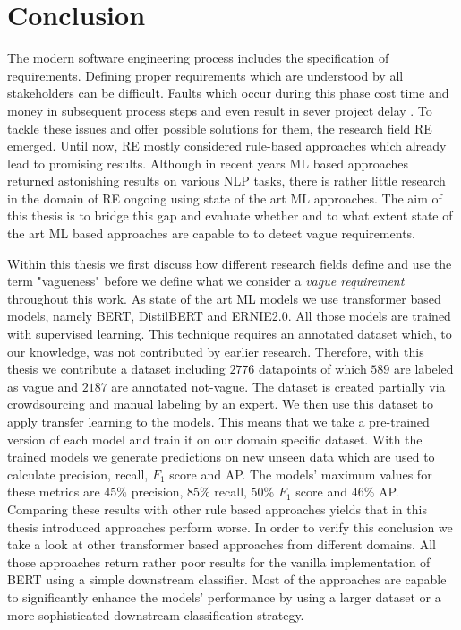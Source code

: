 \chapter{Conclusion}
\label{chp:conclusion}
The modern software engineering process includes the specification of requirements.
Defining proper requirements which are understood by all stakeholders can be difficult.
Faults which occur during this phase cost time and money in subsequent process steps \parencite{Mendez:2016} and even result in sever project delay \parencite{Femmer:2014}.
To tackle these issues and offer possible solutions for them, the research field \ac{RE} emerged.
Until now, \ac{RE} mostly considered rule-based approaches which already lead to promising results.
Although in recent years \ac{ML} based approaches returned astonishing results on various \ac{NLP} tasks, there is rather little research in the domain of \ac{RE} ongoing using state of the art \ac{ML} approaches.
The aim of this thesis is to bridge this gap and evaluate whether and to what extent state of the art \ac{ML} based approaches are capable to to detect vague requirements.

Within this thesis we first discuss how different research fields define and use the term "vagueness" before we define what we consider a \textit{vague requirement} throughout this work.
As state of the art \ac{ML} models we use transformer based models, namely \ac{BERT}, \ac{DistilBERT} and \ac{ERNIE2.0}.
All those models are trained with supervised learning.
This technique requires an annotated dataset which, to our knowledge, was not contributed by earlier research.
Therefore, with this thesis we contribute a dataset including $2776$ datapoints of which $589$ are labeled as vague and $2187$ are annotated not-vague.
The dataset is created partially via crowdsourcing and manual labeling by an expert.
We then use this dataset to apply transfer learning to the models.
This means that we take a pre-trained version of each model and train it on our domain specific dataset.
With the trained models we generate predictions on new unseen data which are used to calculate precision, recall, $F_1$ score and \ac{AP}.
The models' maximum values for these metrics are $45\%$ precision, $85\%$ recall, $50\%$ $F_1$ score and $46\%$ \ac{AP}.
Comparing these results with other rule based approaches yields that in this thesis introduced approaches perform worse.
In order to verify this conclusion we take a look at other transformer based approaches from different domains.
All those approaches return rather poor results for the vanilla implementation of \ac{BERT} using a simple downstream classifier.
Most of the approaches are capable to significantly enhance the models' performance by using a larger dataset or a more sophisticated downstream classification strategy.


